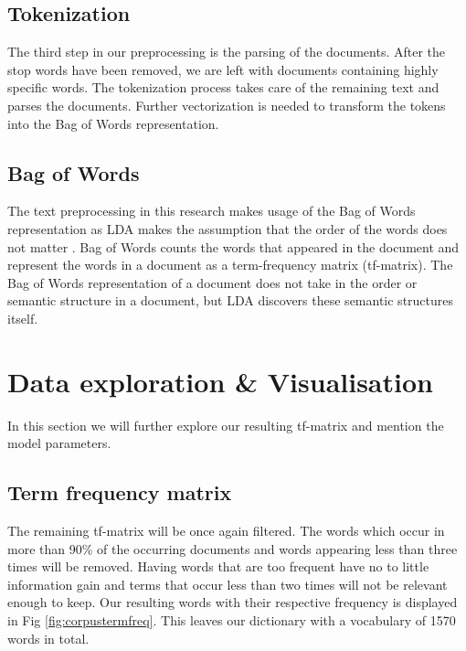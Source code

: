 \subsection{Tokenization}\label{methodology:tokenization}
The third step in our preprocessing is the parsing of the documents. After the stop words have been removed, we are left with documents containing highly specific words. The tokenization process takes care of the remaining text and parses the documents. Further vectorization is needed to transform the tokens into the Bag of Words representation.

\subsection{Bag of Words} \label{methodology:bagow}
The text preprocessing in this research makes usage of the Bag of Words representation as LDA makes the assumption that the order of the words does not matter \cite{Blei2010}. Bag of Words counts the words that appeared in the document and represent the words in a document as a term-frequency matrix (tf-matrix). The Bag of Words representation of a document does not take in the order or semantic structure in a document, but LDA discovers these semantic structures itself. 

\section{Data exploration \& Visualisation} \label{methodology:explo&visu}
In this section we will further explore our resulting tf-matrix and mention the model parameters.

\subsection{Term frequency matrix}
The remaining tf-matrix will be once again filtered. The words which occur in more than 90\% of the occurring documents and words appearing less than three times will be removed. Having words that are too frequent have no to little information gain and terms that occur less than two times will not be relevant enough to keep. Our resulting words with their respective frequency is displayed in Fig \ref{fig:corpustermfreq}. This leaves our dictionary with a vocabulary of 1570 words in total.

